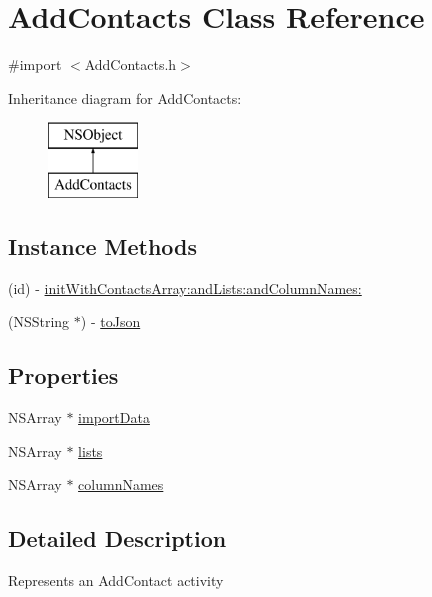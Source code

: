 \hypertarget{interface_add_contacts}{\section{Add\-Contacts Class Reference}
\label{interface_add_contacts}
}


{\ttfamily \#import $<$Add\-Contacts.\-h$>$}

Inheritance diagram for Add\-Contacts\-:\begin{figure}[H]
\begin{center}
\leavevmode
\includegraphics[height=2.000000cm]{interface_add_contacts}
\end{center}
\end{figure}
\subsection*{Instance Methods}
\begin{DoxyCompactItemize}
\item 
(id) -\/ \hyperlink{interface_add_contacts_af3ebc8eed4d3e594cf4035fa0a09cd90}{init\-With\-Contacts\-Array\-:and\-Lists\-:and\-Column\-Names\-:}
\item 
(N\-S\-String $\ast$) -\/ \hyperlink{interface_add_contacts_ac7cc3a655cc7a0f4628b0fcfd4803932}{to\-Json}
\end{DoxyCompactItemize}
\subsection*{Properties}
\begin{DoxyCompactItemize}
\item 
N\-S\-Array $\ast$ \hyperlink{interface_add_contacts_a78dbd515fd874bae9cfb9e3281440526}{import\-Data}
\item 
N\-S\-Array $\ast$ \hyperlink{interface_add_contacts_a5e31df8915ef05031b2856e54c0bbca6}{lists}
\item 
N\-S\-Array $\ast$ \hyperlink{interface_add_contacts_a5fda7a6b8014bccf3db9e6062c64e1b1}{column\-Names}
\end{DoxyCompactItemize}


\subsection{Detailed Description}
Represents an Add\-Contact activity 

